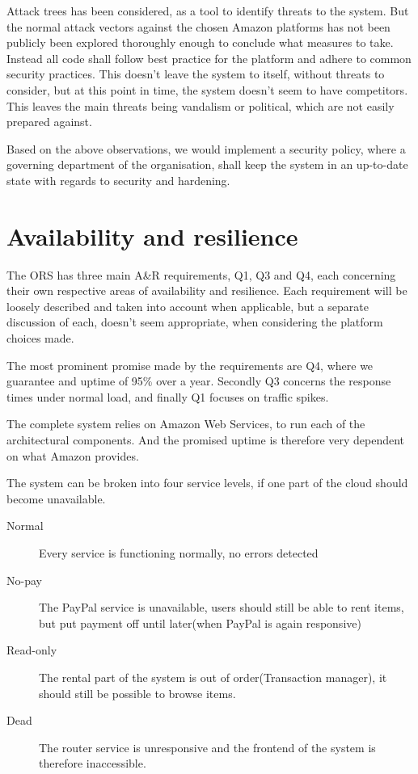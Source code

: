 Attack trees has been considered, as a tool to identify threats to the system.
But the normal attack vectors against the chosen Amazon platforms has not been
publicly been explored thoroughly enough to conclude what measures to take.
Instead all code shall follow best practice for the platform and adhere to
common security practices. This doesn't leave the system to itself, without
threats to consider, but at this point in time, the system doesn't seem to have
competitors. This leaves the main threats being vandalism or political, which
are not easily prepared against.

Based on the above observations, we would implement a security policy, where a
governing department of the organisation, shall keep the system in an
up-to-date state with regards to security and hardening.

\section{Availability and resilience}
\label{sec:avail-resil}
The ORS has three main A\&R requirements, Q1, Q3 and Q4, each concerning their
own respective areas of availability and resilience. Each requirement will be
loosely described and taken into account when applicable, but a separate
discussion of each, doesn't seem appropriate, when considering the platform 
choices made.

The most prominent promise made by the requirements are Q4, where we guarantee
and uptime of 95\% over a year. Secondly Q3 concerns the response times under
normal load, and finally Q1 focuses on traffic spikes.

The complete system relies on Amazon Web Services, to run each of the
architectural components. And the promised uptime is therefore very dependent
on what Amazon provides.

The system can be broken into four service levels, if one part of the cloud
should become unavailable.

\begin{description}
    \item[Normal] Every service is functioning normally, no errors detected
    \item[No-pay] The PayPal service is unavailable, users should still be able
        to rent items, but put payment off until later(when PayPal is again
        responsive)
    \item[Read-only] The rental part of the system is out of order(Transaction
        manager), it should still be possible to browse items.
    \item[Dead] The router service is unresponsive and the frontend of the
        system is therefore inaccessible.
\end{description}

